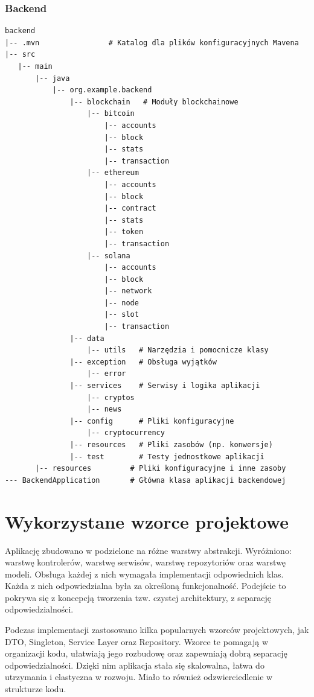 \subsubsection{Backend}
\begin{lstlisting}[basicstyle=\footnotesize\ttfamily]
backend
|-- .mvn                # Katalog dla plików konfiguracyjnych Mavena
|-- src
   |-- main
       |-- java
           |-- org.example.backend
               |-- blockchain   # Moduły blockchainowe
                   |-- bitcoin
                       |-- accounts
                       |-- block
                       |-- stats
                       |-- transaction
                   |-- ethereum
                       |-- accounts
                       |-- block
                       |-- contract
                       |-- stats
                       |-- token
                       |-- transaction
                   |-- solana
                       |-- accounts
                       |-- block
                       |-- network
                       |-- node
                       |-- slot
                       |-- transaction
               |-- data
                   |-- utils   # Narzędzia i pomocnicze klasy
               |-- exception   # Obsługa wyjątków
                   |-- error
               |-- services    # Serwisy i logika aplikacji
                   |-- cryptos
                   |-- news
               |-- config      # Pliki konfiguracyjne
                   |-- cryptocurrency
               |-- resources   # Pliki zasobów (np. konwersje)
               |-- test        # Testy jednostkowe aplikacji
       |-- resources         # Pliki konfiguracyjne i inne zasoby
--- BackendApplication       # Główna klasa aplikacji backendowej
\end{lstlisting}



\section{Wykorzystane wzorce projektowe}
Aplikację zbudowano w podzielone na różne warstwy abstrakcji. Wyróżniono: warstwę kontrolerów, warstwę serwisów, warstwę repozytoriów oraz warstwę modeli. Obsługa każdej z nich wymagała implementacji odpowiednich klas. Każda z nich odpowiedzialna była za określoną funkcjonalność. Podejście to pokrywa się z koncepcją tworzenia tzw. czystej architektury, z separację odpowiedzialności. 

Podczas implementacji zastosowano kilka popularnych wzorców projektowych, jak DTO, Singleton, Service Layer oraz Repository. Wzorce te pomagają w organizacji kodu, ułatwiają jego rozbudowę oraz zapewniają dobrą separację odpowiedzialności. Dzięki nim aplikacja stała się skalowalna, łatwa do utrzymania i elastyczna w rozwoju. Miało to również odzwierciedlenie w strukturze kodu.

